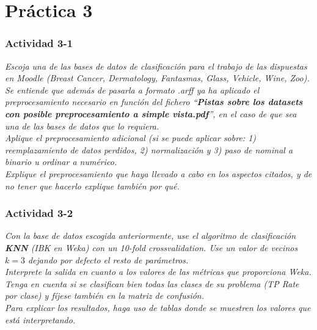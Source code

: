 \part{Práctica 3}
\section{Actividad 3-1}
\label{p31}
\begin{center}
    \parbox{12cm}{\justify\textit{Escoja una de las bases de datos de clasificación para el trabajo de las dispuestas en Moodle (Breast Cancer, Dermatology, Fantasmas, Glass, Vehicle, Wine, Zoo). \\
    Se entiende que además de pasarla a formato .arff ya ha aplicado el preprocesamiento necesario en función del fichero ``\textbf{Pistas sobre los datasets con posible preprocesamiento a simple vista.pdf}'', en el caso de que sea una de las bases de datos que lo requiera.\\
    Aplique el preprocesamiento adicional (si se puede aplicar sobre: 1) reemplazamiento de datos perdidos, 2) normalización y 3) paso de nominal a binario u ordinar a numérico. \\
    Explique el preprocesamiento que haya llevado a cabo en los aspectos citados, y de no tener que hacerlo explique también por qué.}}
\end{center}

\clearpage
\section{Actividad 3-2}
\label{p32}
\begin{center}
    \parbox{12cm}{\justify\textit{Con la base de datos escogida anteriormente, use el algoritmo de clasificación \textbf{KNN} (IBK en Weka) con un 10-fold crossvalidation. Use un valor de vecinos $k=3$ dejando por defecto el resto de parámetros.\\
    Interprete la salida en cuanto a los valores de las métricas que proporciona Weka.\\
    Tenga en cuenta si se clasifican bien todas las clases de su problema (TP Rate por clase) y fíjese también en la matriz de confusión. \\
    Para explicar los resultados, haga uso de tablas donde se muestren los valores que está interpretando.}}
\end{center}

